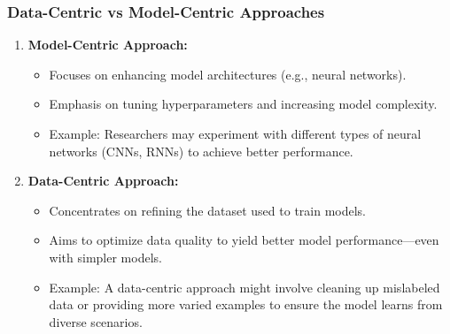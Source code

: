 \documentclass[aspectratio=169]{beamer}
\begin{document}
\begin{frame}[fragile]
    \frametitle{Data-Centric vs Model-Centric Approaches}
    \begin{enumerate}
        \item \textbf{Model-Centric Approach:}
            \begin{itemize}
                \item Focuses on enhancing model architectures (e.g., neural networks).
                \item Emphasis on tuning hyperparameters and increasing model complexity.
                \item Example: Researchers may experiment with different types of neural networks (CNNs, RNNs) to achieve better performance.
            \end{itemize}
        
        \item \textbf{Data-Centric Approach:}
            \begin{itemize}
                \item Concentrates on refining the dataset used to train models.
                \item Aims to optimize data quality to yield better model performance—even with simpler models.
                \item Example: A data-centric approach might involve cleaning up mislabeled data or providing more varied examples to ensure the model learns from diverse scenarios.
            \end{itemize}
    \end{enumerate}
\end{frame}
\end{document}
